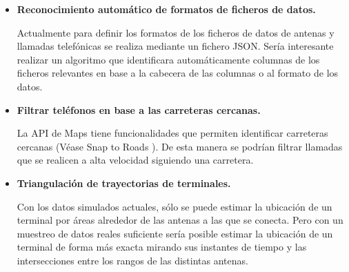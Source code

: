     \begin{itemize}
      \item \textbf{Reconocimiento automático de formatos de ficheros de datos.}
      
      Actualmente para definir los formatos de los ficheros de datos de antenas y llamadas telefónicas se realiza mediante un fichero JSON. 
      Sería interesante realizar un algoritmo que identificara automáticamente columnas de los ficheros relevantes en base a la cabecera de las columnas o al formato de los datos.
      
      \item \textbf{Filtrar teléfonos en base a las carreteras cercanas.}
      
      La API de Maps tiene funcionalidades que permiten identificar carreteras cercanas (Véase Snap to Roads \cite{snaproad}). De esta manera se podrían filtrar llamadas que se realicen a alta velocidad siguiendo una carretera.
      
      \item \textbf{Triangulación de trayectorias de terminales.}
      
      Con los datos simulados actuales, sólo se puede estimar la ubicación de un terminal por áreas alrededor de las antenas a las que se conecta.
      Pero con un muestreo de datos reales suficiente sería posible estimar la ubicación de un terminal de forma más exacta mirando sus instantes de tiempo y las intersecciones entre los rangos de las distintas antenas. 
    \end{itemize}